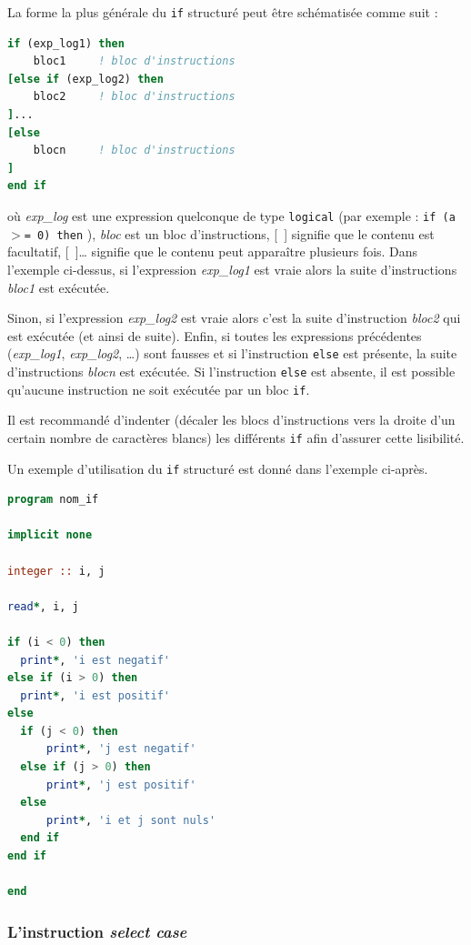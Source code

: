 \documentclass[a4paper,twoside]{article}
\begin{document}
La forme la plus générale du \texttt{if} structuré peut être 
schématisée comme suit :
\begin{lstlisting}[language=Fortran]
if (exp_log1) then
    bloc1     ! bloc d'instructions 
[else if (exp_log2) then 
    bloc2     ! bloc d'instructions 
]...
[else
    blocn     ! bloc d'instructions 
] 
end if
\end{lstlisting}
où \emph{exp\_log} est une expression quelconque de type \texttt{logical} (par exemple : \texttt{if (a $>$= 0) then} ), \emph{bloc} est un bloc d'instruc\-tions, \mbox{[ ]} signifie que le contenu est facultatif, \mbox{[ ]\ldots} signifie que le contenu peut apparaître plusieurs fois. Dans l'exemple ci-dessus, si l'expression \emph{exp\_log1} est vraie alors la suite d'instruc\-tions \emph{bloc1} est exécutée. 

Sinon, si l'expression \emph{exp\_log2} est vraie alors c'est la suite d'instruction \emph{bloc2} qui est exécutée (et ainsi de suite). Enfin, si toutes les expressions précédentes (\emph{exp\_log1}, \emph{exp\_log2}, \ldots) sont fausses et si l'instruction \texttt{else} est présente, la suite d'instructions \emph{blocn} est exécutée. Si l'instruc\-tion \texttt{else} est absente, il est possible qu'aucune instruction ne soit exécutée par un bloc \texttt{if}.

\begin{remarque}
Il est recommandé d'indenter (décaler les blocs d'instructions vers la droite d'un certain nombre de caractères blancs) les différents \texttt{if} afin d'assurer cette lisibilité. 
\end{remarque}



Un exemple d'utilisation du \texttt{if} structuré est donné dans l'exemple ci-après. 
\begin{lstlisting}[language=Fortran]
program nom_if

implicit none

integer :: i, j

read*, i, j

if (i < 0) then
  print*, 'i est negatif'
else if (i > 0) then
  print*, 'i est positif'
else
  if (j < 0) then
      print*, 'j est negatif'
  else if (j > 0) then
      print*, 'j est positif'
  else
      print*, 'i et j sont nuls'
  end if
end if

end
\end{lstlisting}

\subsubsection{L'instruction \emph{select case}}
\end{document}
